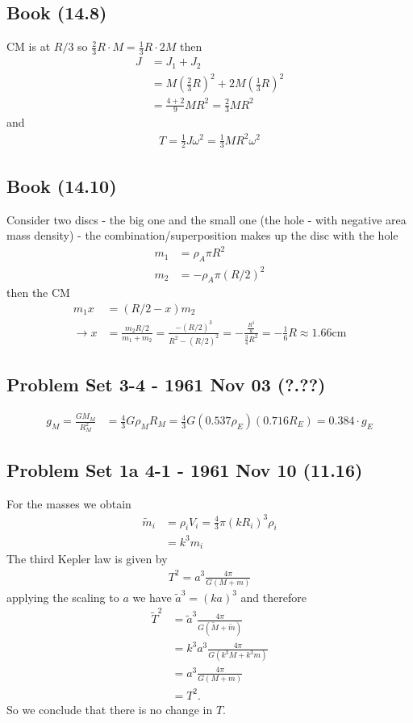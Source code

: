 \documentclass[../main.tex]{subfiles}
\begin{document}
\subsection{Book (14.8)}
CM is at $R/3$ so $\frac{2}{3}R\cdot M=\frac{1}{3}R\cdot 2M$ then
\begin{align}
J&=J_1+J_2\\
&=M\left(\frac{2}{3}R\right)^2+2M\left(\frac{1}{3}R\right)^2\\
&=\frac{4+2}{9}MR^2=\frac{2}{3}MR^2
\end{align}
and
\begin{align}
T=\frac{1}{2}J\omega^2=\frac{1}{3}MR^2\omega^2
\end{align}

\subsection{Book (14.10)}
Consider two discs - the big one and the small one (the hole - with negative area mass density) - the combination/superposition makes up the disc with the hole
\begin{align}
m_1&=\rho_A\pi R^2\\
m_2&=-\rho_A\pi (R/2)^2
\end{align}
then the CM
\begin{align}
m_1x&=(R/2-x)m_2\\
\rightarrow x
&=\frac{m_2R/2}{m_1+m_2}
=\frac{-(R/2)^3}{R^2-(R/2)^2}
=-\frac{\frac{R^3}{8}}{\frac{3}{4}R^2}=-\frac{1}{6}R\approx 1.66\text{cm}
\end{align}



\subsection{Problem Set 3-4 - 1961 Nov 03 (?.??)}
\begin{align}
    g_M=\frac{GM_M}{R_M^2}&=\frac{4}{3}G\rho_M R_M=\frac{4}{3}G (0.537\rho_E) (0.716R_E)=0.384 \cdot g_E
\end{align}

\subsection{Problem Set 1a 4-1 - 1961 Nov 10 (11.16)}
For the masses we obtain
\begin{align}
\widetilde{m}_i
&=\rho_i V_i=\frac{4}{3}\pi (kR_i)^3\rho_i\\
&=k^3m_i
\end{align}
The third Kepler law is given by
\begin{align}
T^2=a^3\frac{4\pi}{G(M+m)}
\end{align}
applying the scaling to $a$ we have $\widetilde{a}^3=(ka)^3$ and therefore
\begin{align}
\widetilde{T}^2
&=\widetilde{a}^3\frac{4\pi}{G(\widetilde{M}+\widetilde{m})}\\
&=k^3a^3\frac{4\pi}{G(k^3M+k^3m)}\\
&=a^3\frac{4\pi}{G(M+m)}\\
&=T^2.
\end{align}
So we conclude that there is no change in $T$. 
\end{document}
